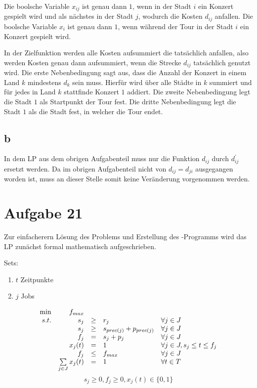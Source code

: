 \documentclass[10pt]{article}
\begin{document}
      Die boolsche Variable $x_{ij}$ ist genau dann $1$, wenn in der Stadt $i$
      ein Konzert gespielt wird und als nächstes in der Stadt $j$, wodurch die
      Kosten $d_{ij}$ anfallen.
      Die boolsche Variable $x_{i}$ ist genau dann $1$, wenn während der Tour
      in der Stadt $i$ ein Konzert gespielt wird.

      In der Zielfunktion werden alle Kosten aufsummiert die tatsächlich
      anfallen, also werden Kosten genau dann aufsummiert, wenn die Strecke
      $d_{ij}$ tatsächlich genutzt wird.
      Die erste Nebenbedingung sagt aus, dass die Anzahl der Konzert in einem
      Land $k$ mindestens $d_{k}$ sein muss. Hierfür wird über alle Städte in
      $k$ summiert und für jedes in Land $k$ stattfinde Konzert $1$ addiert.
      Die zweite Nebenbedingung legt die Stadt $1$ als Startpunkt der Tour fest.
      Die dritte Nebenbedingung legt die Stadt $1$ als die Stadt fest, in
      welcher die Tour endet.

    \subsection*{b}
      In dem LP aus dem obrigen Aufgabenteil muss nur die Funktion $d_{ij}$
      durch $d_{ij}^{\prime}$ ersetzt werden. Da im obrigen Aufgabenteil nicht
      von $d_{ij}=d_{ji}$ ausgegangen worden ist, muss an dieser Stelle somit
      keine Veränderung vorgenommen werden.


  \section*{Aufgabe 21}
    Zur einfacherern Lösung des Problems und Erstellung des -Programms wird das LP zunächst formal mathematisch aufgeschrieben.

    Sets:
    \begin{enumerate}
        \item $t$ Zeitpunkte
        \item $j$ Jobs
    \end{enumerate}

    \begin{displaymath}
      \begin{array}{ r r c l l }
        \min & f_{max} & & & \\
        s.t. & s_{j} & \geq & r_{j} & \forall j\in J \\
             & s_{j} & \geq & s_{prec(j)} + p_{prec(j)} & \forall j \in J \\
             & f_{j} & = & s_{j} + p_{j} & \forall j\in J\\
             & x_{j}(t) & = & 1 & \forall j\in J, s_{j} \leq t \leq f_{j}\\
             & f_{j} & \leq & f_{max} & \forall j \in J \\
             & \sum\limits_{j\in J} x_{j}(t) &=& 1 & \forall t\in T \\
      \end{array}
    \end{displaymath}
    \begin{displaymath}
      s_{j}\geq 0, f_{j}\geq 0,x_{j}(t)\in\{0,1\}
    \end{displaymath}
\end{document}
